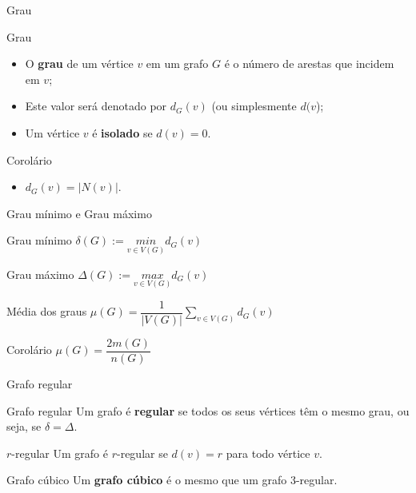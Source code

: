 \documentclass[xcolor=dvipsnames,table]{beamer}
\begin{document}
	\begin{frame}{Grau}
		\begin{block}{Grau}
			\begin{itemize}
				\item O {\bf grau} de um vértice $v$ em um grafo $G$ é o número de arestas que incidem em $v$;
				\item Este valor será denotado por $d_G(v)$ (ou simplesmente $d(v$); 
				\item Um vértice $v$ é {\bf isolado} se $d(v) = 0$.
			\end{itemize}
		\end{block}
		\begin{block}{Corolário}
			\begin{itemize}
				\item $d_G(v) = |N(v)|$.
			\end{itemize}
		\end{block}		
	\end{frame}
	
	\begin{frame}[shrink]{Grau mínimo e Grau máximo}
		\begin{block}{Grau mínimo}
			$\delta(G) :=  \underset{v \in V(G)}{min} d_G(v)$
		\end{block} 
		\begin{block}{Grau máximo}
			$\Delta(G) :=  \underset{v \in V(G)}{max} d_G(v)$
		\end{block} 
		\begin{block}{Média dos graus}
			$\mu(G) =  \dfrac{1}{|V(G)|} \underset{v \in V(G)}{\sum} d_G(v)$
		\end{block} 
		\begin{block}{Corolário}
			$\mu(G) = \dfrac{2m(G)}{n(G)}$
		\end{block}
	\end{frame}
	
	\begin{frame}{Grafo regular}
		\begin{block}{Grafo regular}
			Um grafo é {\bf regular} se todos os seus vértices têm o mesmo grau, ou seja, se $\delta = \Delta$.
		\end{block} 
		\begin{block}{$r$-regular}
			Um grafo é $r$-regular se $d(v) = r$ para todo vértice $v$.
		\end{block} 
		\begin{block}{Grafo cúbico}
			Um {\bf grafo cúbico} é o mesmo que um grafo 3-regular.
		\end{block}
	\end{frame}
	
\end{document}
